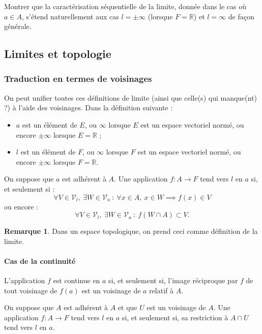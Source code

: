 \documentclass[french]{article}
\newcommand{\R}{\mathbb{R}}
\theoremstyle{plain}
\theoremstyle{definition}
\newtheorem*{rmq}{Remarque}
\theoremstyle{remark}
\begin{document}
\begin{exo}
	Montrer que la caractérisation séquentielle de la limite, donnée dans le cas où $a\in A$, s'étend naturellement aux cas $l=\pm\infty$ (lorsque $F=\R$) et $l=\infty$ de façon générale.
\end{exo}

\subsection{Limites et topologie}

\subsubsection*{Traduction en termes de voisinages}

On peut unifier toutes ces définitions de limite (ainsi que celle(s) qui manque(nt) ?) à l'aide des voisinages. Dans la définition suivante :
\begin{itemize}
	\item $a$ est un élément de $E$, ou $\infty$ lorsque $E$ est un espace vectoriel normé, ou encore $\pm\infty$ lorsque $E=\R$ ;
	\item $l$ est un élément de $F$, ou $\infty$ lorsque $F$ est un espace vectoriel normé, ou encore $\pm\infty$ lorsque $F=\R$.
\end{itemize}

\begin{prop}%
	On suppose que $a$ est adhérent à $A$. Une application $f:A\to F$ tend vers $l$ en $a$ si, et seulement si : $$\forall V\in\mathcal{V}_l,\ \exists W\in\mathcal{V}_a\ : \ \forall x\in A,\ x\in W\implies f(x)\in V$$ ou encore :
	$$\forall V\in\mathcal{V}_l,\ \exists W\in\mathcal{V}_a\ :\ f(W\cap A)\subset V.$$
\end{prop}

\begin{rmq}
	Dans un espace topologique, on prend ceci comme définition de la limite.
\end{rmq}

\paragraph{Cas de la continuité} L'application $f$ est continue en $a$ si, et seulement si, l'image réciproque par $f$ de tout voisinage de $f(a)$ est un voisinage de $a$ relatif à $A$.

\begin{prop}%
	On suppose que $A$ est adhérent à $A$ et que $U$ est un voisinage de $A$. Une application $f:A\to F$ tend vers $l$ en $a$ si, et seulement si, sa restriction à $A\cap U$ tend vers $l$ en $a$.
\end{prop}
\end{document}
